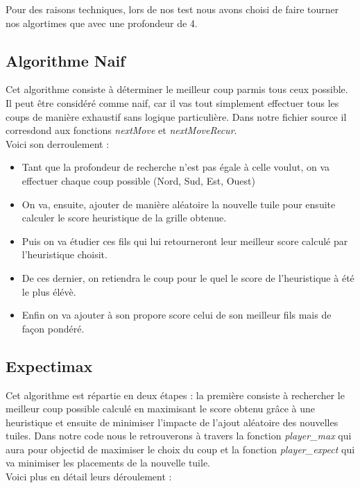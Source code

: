 \documentclass[11pt,a4paper]{article}
\begin{document}
Pour des raisons techniques, lors de nos test nous avons choisi de faire tourner nos algortimes que avec une profondeur de 4.

\subsection{Algorithme Naif}
Cet algorithme consiste à déterminer le meilleur coup parmis tous ceux possible. Il peut être considéré comme naif, car il vas tout simplement effectuer tous les coups de manière exhaustif sans logique particulière. Dans notre fichier source il corresdond aux fonctions \textit{nextMove} et \textit{nextMoveRecur}.\\
Voici son derroulement : 
\begin{itemize}
\item Tant que la profondeur de recherche n'est pas égale à celle voulut, on va effectuer chaque coup possible (Nord, Sud, Est, Ouest)
\item On va, ensuite, ajouter de manière aléatoire la nouvelle tuile pour ensuite calculer le score heuristique de la grille obtenue.
\item Puis on va étudier ces fils qui lui retourneront leur meilleur score calculé par l'heuristique choisit. 
\item De ces dernier, on retiendra le coup pour le quel le score de l'heuristique à été le plus élévè.
\item Enfin on va ajouter à son propore score celui de son meilleur fils mais de façon pondéré. 
\end{itemize}

\subsection{Expectimax}

Cet algorithme est répartie en deux étapes : la première consiste à rechercher le meilleur coup possible calculé en maximisant le score obtenu grâce à une heuristique et ensuite de minimiser l'impacte de l'ajout aléatoire des nouvelles tuiles.
Dans notre code nous le retrouverons à travers la fonction \textit{player\_max} qui aura pour objectid de maximiser le choix du coup et la fonction \textit{player\_expect} qui 
va minimiser les placements de la nouvelle tuile.\\
Voici plus en détail leurs déroulement :
\end{document}
